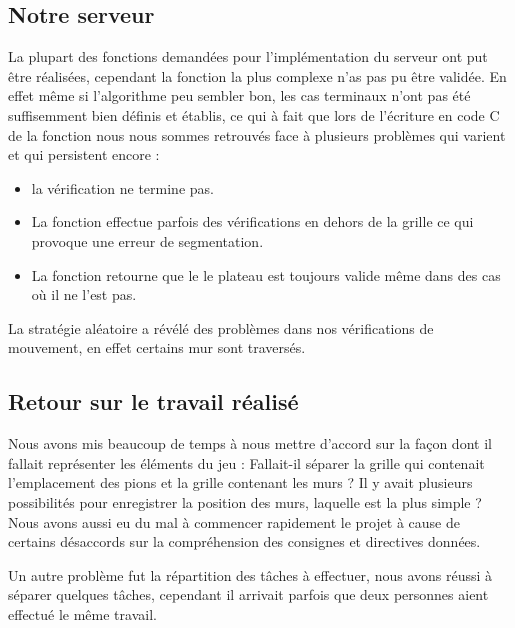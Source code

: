 \documentclass[a4paper, draft]{article}
\begin{document}
\subsection{Notre serveur}

La plupart des fonctions demandées pour l'implémentation du serveur ont put être réalisées, cependant la fonction la plus complexe n'as pas pu être validée.
En effet même si l'algorithme peu sembler bon, les cas terminaux n'ont pas été suffisemment bien définis et établis, ce qui à fait que lors de l'écriture en code C de 
la fonction nous nous sommes retrouvés face à plusieurs problèmes qui varient et qui persistent encore :  
\begin{itemize}
  \item la vérification ne termine pas.
  \item La fonction effectue parfois des vérifications en dehors de la grille ce qui provoque une erreur de segmentation.
  \item La fonction retourne que le le plateau est toujours valide même dans des cas où il ne l'est pas. 
  \end{itemize}
La stratégie aléatoire a révélé des problèmes dans nos vérifications de mouvement, en effet certains mur sont traversés.

\subsection{Retour sur le travail réalisé}
Nous avons mis beaucoup de temps à nous mettre d'accord sur la façon dont il fallait représenter les éléments du jeu : 
Fallait-il séparer la grille qui contenait l'emplacement des pions et la grille contenant les murs ?
Il y avait plusieurs possibilités pour enregistrer la position des murs, laquelle est la plus simple ? 
Nous avons aussi eu du mal à commencer rapidement le projet
à cause de certains désaccords sur la compréhension des consignes et directives données.

Un autre problème fut la répartition des tâches à effectuer, nous avons réussi à séparer quelques tâches, cependant il arrivait parfois que deux personnes aient effectué le même travail.
\end{document}
